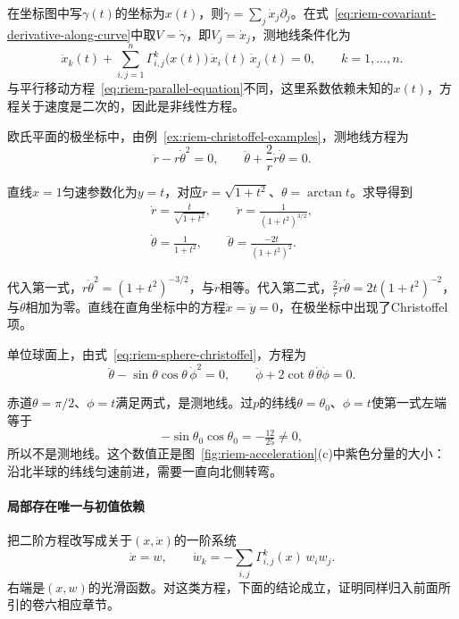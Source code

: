 在坐标图中写$\gamma(t)$的坐标为$x(t)$，则$\dot\gamma=\sum_j\dot x_j\partial_j$。在式~\eqref{eq:riem-covariant-derivative-along-curve}中取$V=\dot\gamma$，即$V_j=\dot x_j$，测地线条件化为
\begin{equation}
\ddot x_k(t)+\sum_{i,j=1}^n\Gamma^k_{i,j}\bigl(x(t)\bigr)\,\dot x_i(t)\,\dot x_j(t)=0,\qquad k=1,\ldots,n .
\label{eq:riem-geodesic-equation}
\end{equation}
与平行移动方程~\eqref{eq:riem-parallel-equation}不同，这里系数依赖未知的$x(t)$，方程关于速度是二次的，因此是非线性方程。

\begin{example}[极坐标中的直线与球面上的大圆]
\label{ex:riem-geodesic-examples}
欧氏平面的极坐标中，由例~\ref{ex:riem-christoffel-examples}，测地线方程为
\[
\ddot r-r\dot\theta^2=0,\qquad\ddot\theta+\frac2r\dot r\dot\theta=0 .
\]

直线$x=1$匀速参数化为$y=t$，对应$r=\sqrt{1+t^2}$、$\theta=\arctan t$。求导得到
\[
\begin{gathered}
\dot r=\frac t{\sqrt{1+t^2}},\qquad\ddot r=\frac1{(1+t^2)^{3/2}},\\
\dot\theta=\frac1{1+t^2},\qquad\ddot\theta=\frac{-2t}{(1+t^2)^2}.
\end{gathered}
\]

代入第一式，$r\dot\theta^2=(1+t^2)^{-3/2}$，与$\ddot r$相等。代入第二式，$\frac2r\dot r\dot\theta=2t(1+t^2)^{-2}$，与$\ddot\theta$相加为零。直线在直角坐标中的方程$\ddot x=\ddot y=0$，在极坐标中出现了Christoffel项。

单位球面上，由式~\eqref{eq:riem-sphere-christoffel}，方程为
\[
\ddot\theta-\sin\theta\cos\theta\,\dot\phi^2=0,\qquad\ddot\phi+2\cot\theta\,\dot\theta\dot\phi=0 .
\]

赤道$\theta=\pi/2$、$\phi=t$满足两式，是测地线。过$p$的纬线$\theta=\theta_0$、$\phi=t$使第一式左端等于
\[
-\sin\theta_0\cos\theta_0=-\tfrac{12}{25}\neq0 ,
\]
所以不是测地线。这个数值正是图~\ref{fig:riem-acceleration}(c)中紫色分量的大小：沿北半球的纬线匀速前进，需要一直向北侧转弯。
\end{example}

\paragraph{局部存在唯一与初值依赖}
把二阶方程改写成关于$(x,\dot x)$的一阶系统
\[
\dot x=w,\qquad\dot w_k=-\sum_{i,j}\Gamma^k_{i,j}(x)\,w_iw_j .
\]
右端是$(x,w)$的光滑函数。对这类方程，下面的结论成立，证明同样归入前面所引的卷六相应章节。

